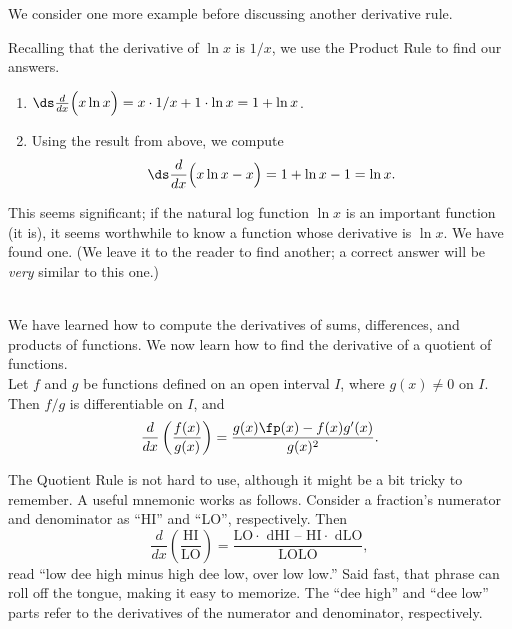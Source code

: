 We consider one more example before discussing another derivative rule.\\

{Recalling that the derivative of $\ln x$ is $1/x$, we use the Product Rule to find our answers.
		\begin{enumerate}
		\item	$\ds \frac{d}{dx}\Big(x\ln x\Big) = x\cdot 1/x + 1\cdot \ln x = 1+\ln x$. 
		\item Using the result from above, we compute $$\ds \frac{d}{dx}\Big(x\ln x-x\Big) = 1+\ln x-1 = \ln x.$$ 
		\end{enumerate}
This seems significant; if the natural log function $\ln x$ is an important function (it is), it seems worthwhile to know a function whose derivative is $\ln x$. We have found one. (We leave it to the reader to find another; a correct answer will be \textit{very} similar to this one.)
}\\

We have learned how to compute the derivatives of sums, differences, and products of functions. We now learn how to find the derivative of a quotient of functions.\\

{Let $f$ and $g$ be functions defined on an open interval $I$, where $g(x) \neq 0$ on $I$. Then $f/g$ is differentiable on $I$, and $$\frac{d}{dx}\left(\frac{f(x)}{g(x)}\right) = \frac{g(x)\fp(x) - f(x)g'(x)}{g(x)^2}.$$
}

The Quotient Rule is not hard to use, although it might be a bit tricky to remember. A useful mnemonic works as follows. Consider a fraction's numerator and denominator as ``HI'' and ``LO'', respectively. Then $$\frac{d}{dx}\left(\frac{\text{HI}}{\text{LO}}\right) = \frac{\text{LO$\cdot$ dHI -- HI$\cdot$ dLO}}{\text{LOLO}},$$ read ``low dee high minus high dee low, over low low.'' Said fast, that phrase can roll off the tongue, making it easy to memorize. The ``dee high'' and ``dee low'' parts refer to the derivatives of the numerator and denominator, respectively.\\

